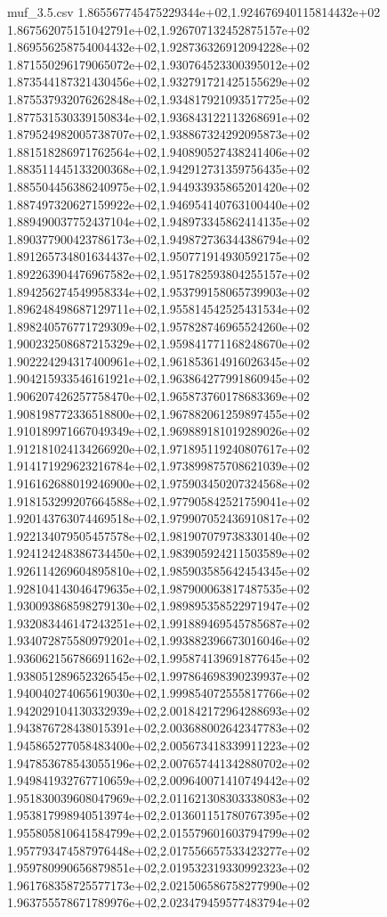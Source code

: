 \begin{filecontents*}{muf_3.5.csv}
1.865567745475229344e+02,1.924676940115814432e+02
1.867562075151042791e+02,1.926707132452875157e+02
1.869556258754004432e+02,1.928736326912094228e+02
1.871550296179065072e+02,1.930764523300395012e+02
1.873544187321430456e+02,1.932791721425155629e+02
1.875537932076262848e+02,1.934817921093517725e+02
1.877531530339150834e+02,1.936843122113268691e+02
1.879524982005738707e+02,1.938867324292095873e+02
1.881518286971762564e+02,1.940890527438241406e+02
1.883511445133200368e+02,1.942912731359756435e+02
1.885504456386240975e+02,1.944933935865201420e+02
1.887497320627159922e+02,1.946954140763100440e+02
1.889490037752437104e+02,1.948973345862414135e+02
1.890377900423786173e+02,1.949872736344386794e+02
1.891265734801634437e+02,1.950771914930592175e+02
1.892263904476967582e+02,1.951782593804255157e+02
1.894256274549958334e+02,1.953799158065739903e+02
1.896248498687129711e+02,1.955814542525431534e+02
1.898240576771729309e+02,1.957828746965524260e+02
1.900232508687215329e+02,1.959841771168248670e+02
1.902224294317400961e+02,1.961853614916026345e+02
1.904215933546161921e+02,1.963864277991860945e+02
1.906207426257758470e+02,1.965873760178683369e+02
1.908198772336518800e+02,1.967882061259897455e+02
1.910189971667049349e+02,1.969889181019289026e+02
1.912181024134266920e+02,1.971895119240807617e+02
1.914171929623216784e+02,1.973899875708621039e+02
1.916162688019246900e+02,1.975903450207324568e+02
1.918153299207664588e+02,1.977905842521759041e+02
1.920143763074469518e+02,1.979907052436910817e+02
1.922134079505457578e+02,1.981907079738330140e+02
1.924124248386734450e+02,1.983905924211503589e+02
1.926114269604895810e+02,1.985903585642454345e+02
1.928104143046479635e+02,1.987900063817487535e+02
1.930093868598279130e+02,1.989895358522971947e+02
1.932083446147243251e+02,1.991889469545785687e+02
1.934072875580979201e+02,1.993882396673016046e+02
1.936062156786691162e+02,1.995874139691877645e+02
1.938051289652326545e+02,1.997864698390239937e+02
1.940040274065619030e+02,1.999854072555817766e+02
1.942029104130332939e+02,2.001842172964288693e+02
1.943876728438015391e+02,2.003688002642347783e+02
1.945865277058483400e+02,2.005673418339911223e+02
1.947853678543055196e+02,2.007657441342880702e+02
1.949841932767710659e+02,2.009640071410749442e+02
1.951830039608047969e+02,2.011621308303338083e+02
1.953817998940513974e+02,2.013601151780767395e+02
1.955805810641584799e+02,2.015579601603794799e+02
1.957793474587976448e+02,2.017556657533423277e+02
1.959780990656879851e+02,2.019532319330992323e+02
1.961768358725577173e+02,2.021506586758277990e+02
1.963755578671789976e+02,2.023479459577483794e+02

\end{filecontents*}
